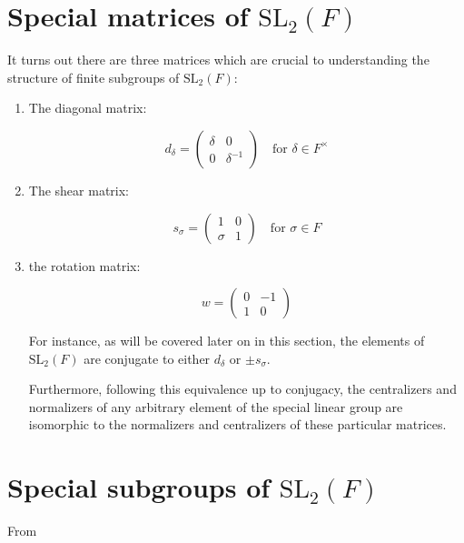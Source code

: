 \section{Special matrices of $\textrm{SL}_2(F)$}

It turns out there are three matrices which are crucial to understanding the structure of finite subgroups of $\textrm{SL}_2(F)$:

\begin{enumerate}
    \item The diagonal matrix:

    \begin{equation}
        d_\delta = \begin{pmatrix}
            \delta & 0\\
            0 & \delta^{-1}
        \end{pmatrix} \quad \text{for $\delta \in F^\times$}
    \end{equation}

    \item The shear matrix:

    \begin{equation}
        s_\sigma = \begin{pmatrix}
            1 & 0\\
            \sigma & 1
        \end{pmatrix} \quad \text{for $\sigma \in F$}
    \end{equation}

    \item the rotation matrix: 

    \begin{equation}
        w = \begin{pmatrix}
            0 & -1\\
            1 & 0
        \end{pmatrix}
    \end{equation}

    For instance, as will be covered later on in this section, the elements of $\textrm{SL}_2(F)$ are conjugate to either $d_\delta$ or $\pm s_\sigma$.

    Furthermore, following this equivalence up to conjugacy, the centralizers and normalizers of any arbitrary element of the special linear group are isomorphic to the normalizers and centralizers of these particular matrices.
    
\end{enumerate}


\section{Special subgroups of $\textrm{SL}_2(F)$}

From  